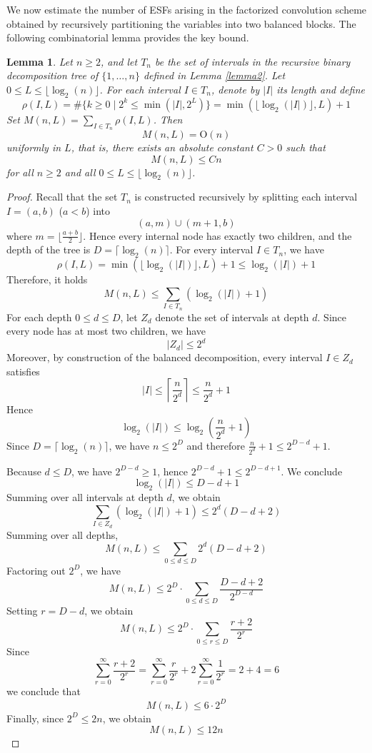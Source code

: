 \documentclass{amsart}
\newtheorem{lemma}[theorem]{Lemma}
\def\cO{{\mathrm{O}}}
\begin{document}
We now estimate the number of ESFs arising in the factorized convolution scheme obtained by
recursively partitioning the variables into two balanced blocks. The following combinatorial
lemma provides the key bound.

\begin{lemma}
\label{lemma3}
Let $n\geq 2$, and let $T_n$ be the set of intervals in the recursive binary decomposition
tree of $\{1,\ldots,n\}$ defined in Lemma \ref{lemma2}.
Let $0\leq L\leq \lfloor \log_2(n) \rfloor$. For each interval $I\in T_n$, denote by $|I|$
its length and define
\[
\rho(I,L) = \# \{k\geq 0\mid 2^k\leq \min(|I|,2^L)\} =
\min(\lfloor \log_2(|I|) \rfloor, L) + 1
\]
Set $M(n,L) = \sum_{I\in T_n} \rho(I,L)$. Then
\[
M(n,L) = \cO(n)
\]
uniformly in $L$, that is, there exists an absolute constant $C > 0$ such that
\[
M(n,L)\leq C n
\]
for all $n\geq 2$ and all $0\leq L\leq \lfloor \log_2(n) \rfloor$.
\end{lemma}

\begin{proof}
Recall that the set $T_n$ is constructed recursively by splitting each interval $I = (a,b)$ ($a < b$)
into
\[
(a,m) \cup (m+1,b)
\]
where $m = \lfloor \frac{a+b}{2} \rfloor$. Hence every internal node has exactly two children,
and the depth of the tree is $D = \lceil \log_2(n) \rceil$. For every interval $I\in T_n$, we have
\[
\rho(I,L) = \min(\lfloor \log_2(|I|)\rfloor, L) + 1\leq \log_2(|I|) + 1
\]
Therefore, it holds
\[
M(n,L)\leq \sum_{I\in T_n} (\log_2(|I|) + 1)
\]
For each depth $0\leq d\leq D$, let $Z_d$ denote the set of intervals at depth $d$.
Since every node has at most two children, we have
\[
|Z_d|\leq 2^d
\]
Moreover, by construction of the balanced decomposition, every interval $I\in Z_d$ satisfies
\[
|I|\leq \left\lceil \frac{n}{2^d} \right\rceil \leq \frac{n}{2^d} + 1
\]
Hence
\[
\log_2(|I|) \leq \log_2(\frac{n}{2^d} + 1)
\]
Since $D = \lceil \log_2(n) \rceil$, we have $n\leq 2^D$ and therefore
$\frac{n}{2^d} + 1\leq 2^{D-d} + 1$.

Because $d\leq D$, we have $2^{D-d}\geq 1$, hence $2^{D-d} + 1\leq 2^{D-d+1}$. We conclude
\[
\log_2(|I|)\leq D-d+1
\]
Summing over all intervals at depth $d$, we obtain
\[
\sum_{I\in Z_d} (\log_2(|I|) + 1)\leq 2^d(D-d+2)
\]
Summing over all depths,
\[
M(n,L)\leq \sum_{0\leq d\leq D} 2^d(D-d+2)
\]
Factoring out $2^D$, we have
\[
M(n,L)\leq 2^D\cdot \sum_{0\leq d\leq D} \frac{D-d+2}{2^{D-d}}
\]
Setting $r = D - d$, we obtain
\[
M(n,L)\leq 2^D\cdot \sum_{0\leq r\leq D} \frac{r+2}{2^r}
\]
Since
\[
\sum_{r=0}^{\infty}\frac{r+2}{2^r} =
\sum_{r=0}^{\infty}\frac{r}{2^r} + 2\sum_{r=0}^{\infty}\frac1{2^r} = 2 + 4 = 6
\]
we conclude that
\[
M(n,L)\leq 6\cdot 2^D
\]
Finally, since $2^D\leq 2 n$, we obtain
\[
M(n,L)\leq 12 n
\]
\end{proof}
\end{document}
